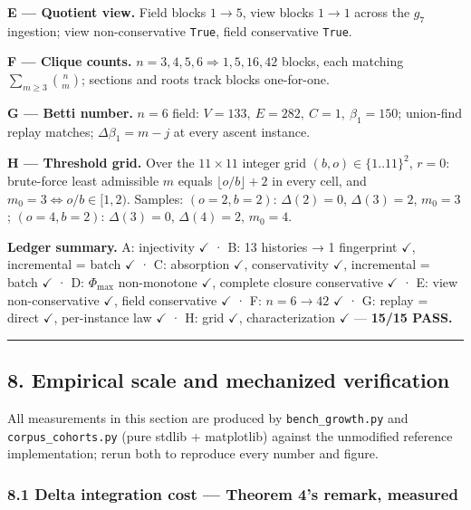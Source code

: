 \documentclass[
  10pt,
]{article}
\begin{document}
\textbf{E --- Quotient view.} Field blocks \(1 \to 5\), view blocks
\(1 \to 1\) across the \(g_7\) ingestion; view non-conservative
\texttt{True}, field conservative \texttt{True}.

\textbf{F --- Clique counts.} \(n = 3,4,5,6 \Rightarrow 1, 5, 16, 42\)
blocks, each matching \(\sum_{m\ge3}\binom{n}{m}\); sections and roots
track blocks one-for-one.

\textbf{G --- Betti number.} \(n=6\) field:
\(V=133,\ E=282,\ C=1,\ \beta_1 = 150\); union-find replay matches;
\(\Delta\beta_1 = m - j\) at every ascent instance.

\textbf{H --- Threshold grid.} Over the \(11\times11\) integer grid
\((b, o) \in \{1..11\}^2\), \(r=0\): brute-force least admissible \(m\)
equals \(\lfloor o/b\rfloor + 2\) in every cell, and
\(m_0 = 3 \iff o/b \in [1, 2)\). Samples: \((o{=}2, b{=}2)\):
\(\Delta(2) = 0\), \(\Delta(3) = 2\), \(m_0 = 3\); \((o{=}4, b{=}2)\):
\(\Delta(3) = 0\), \(\Delta(4) = 2\), \(m_0 = 4\).

\textbf{Ledger summary.} A: injectivity \(\checkmark\) · B: 13 histories
→ 1 fingerprint \(\checkmark\), incremental = batch \(\checkmark\) · C:
absorption \(\checkmark\), conservativity \(\checkmark\), incremental =
batch \(\checkmark\) · D: \(\Phi_{\max}\) non-monotone \(\checkmark\),
complete closure conservative \(\checkmark\) · E: view non-conservative
\(\checkmark\), field conservative \(\checkmark\) · F: \(n{=}6 \to 42\)
\(\checkmark\) · G: replay = direct \(\checkmark\), per-instance law
\(\checkmark\) · H: grid \(\checkmark\), characterization \(\checkmark\)
--- \textbf{15/15 PASS.}

\begin{center}\rule{0.5\linewidth}{0.5pt}\end{center}

\hypertarget{empirical-scale-and-mechanized-verification}{%
\subsection{8. Empirical scale and mechanized
verification}\label{empirical-scale-and-mechanized-verification}}

All measurements in this section are produced by
\texttt{bench\_growth.py} and \texttt{corpus\_cohorts.py} (pure stdlib +
matplotlib) against the unmodified reference implementation; rerun both
to reproduce every number and figure.

\hypertarget{delta-integration-cost-theorem-4s-remark-measured}{%
\subsubsection{8.1 Delta integration cost --- Theorem 4's remark,
measured}\label{delta-integration-cost-theorem-4s-remark-measured}}
\end{document}
